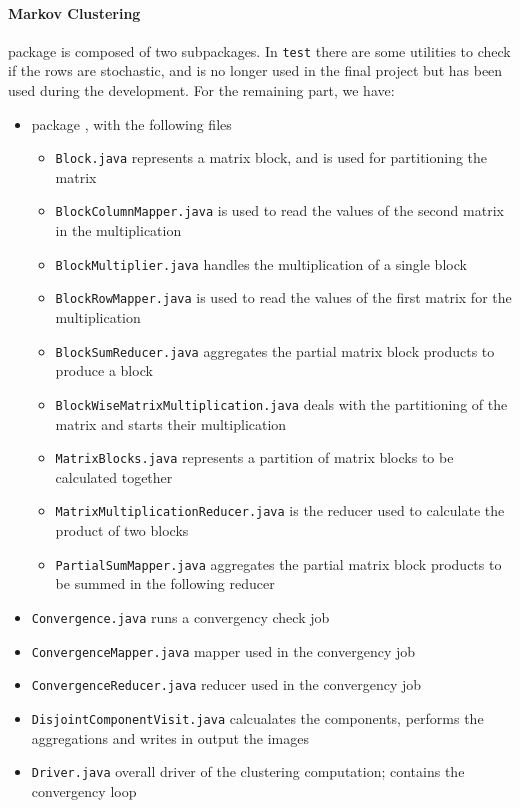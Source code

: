 \paragraph{Markov Clustering} package is composed of two subpackages. In \texttt{test} there are some utilities to check if the rows are stochastic, and is no longer used in the final project but has been used during the development.
For the remaining part, we have:
\begin{itemize}
\item package , with the following files
\begin{itemize}
	\item \texttt{Block.java} represents a matrix block, and is used for partitioning the matrix
	\item \texttt{BlockColumnMapper.java} is used to read the values of the second matrix in the multiplication
	\item \texttt{BlockMultiplier.java} handles the multiplication of a single block
	\item \texttt{BlockRowMapper.java} is used to read the values of the first matrix for the multiplication
	\item \texttt{BlockSumReducer.java} aggregates the partial matrix block products to produce a block
	\item \texttt{BlockWiseMatrixMultiplication.java} deals with the partitioning of the matrix and starts their multiplication
	\item \texttt{MatrixBlocks.java} represents a partition of matrix blocks to be calculated together
	\item \texttt{MatrixMultiplicationReducer.java} is the reducer used to calculate the product of two blocks
	\item \texttt{PartialSumMapper.java} aggregates the partial matrix block products to be summed in the following reducer
\end{itemize}
\item \texttt{Convergence.java} runs a convergency check job
\item \texttt{ConvergenceMapper.java} mapper used in the convergency job
\item \texttt{ConvergenceReducer.java} reducer used in the convergency job
\item \texttt{DisjointComponentVisit.java} calcualates the components, performs the aggregations and writes in output the images
\item \texttt{Driver.java} overall driver of the clustering computation; contains the convergency loop

\end{itemize}
